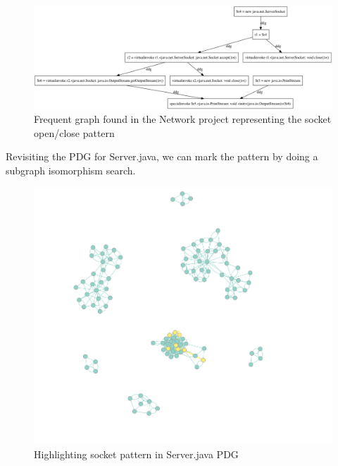 \documentclass[12pt]{article}
\begin{document}
\begin{figure}[ht]
\centerline{
\includegraphics[width=\linewidth]{patterns/networking_pattern.png}
}
\caption{\label{socket_pattern}
    Frequent graph found in the Network project representing the socket open/close pattern
}
\end{figure}


Revisiting the PDG for Server.java, we can mark the pattern by doing a subgraph isomorphism search.

\begin{figure}[ht]
\centerline{
\includegraphics[width=\linewidth]{patterns/networking_isomorphism_full.png}
}
\caption{\label{networking_isomorphism}
    Highlighting socket pattern in Server.java PDG
}
\end{figure}
\end{document}
